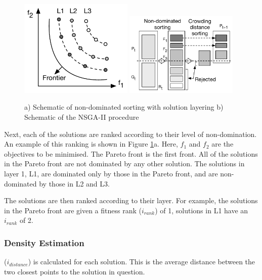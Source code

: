 \begin{figure}[t] 
	\vskip -10pt
	\center
	\includegraphics[width=0.48\textwidth]{Chapter6/figures/carbon_optimiser/paretofrontier/paretofrontier}
	\includegraphics[width=0.480\textwidth]{Chapter6/figures/carbon_optimiser/algsketch/sketch2}
	\vskip -8pt
	\caption{a) Schematic of non-dominated sorting with solution layering b) Schematic of the NSGA-II procedure}
	\label{fig:pareto-layering}
	\vskip -15pt
\end{figure}


Next, each of the solutions are ranked according to their level of non-domination. An example of this ranking is shown in Figure \ref{fig:pareto-layering}a. Here, $f_1$ and $f_2$ are the objectives to be minimised. The Pareto front is the first front. All of the solutions in the Pareto front are not dominated by any other solution. The solutions in layer 1, L1, are dominated only by those in the Pareto front, and are non-dominated by those in L2 and L3.

The solutions are then ranked according to their layer. For example, the solutions in the Pareto front are given a fitness rank ($i_{rank}$) of 1, solutions in L1 have an $i_{rank}$ of 2.

\subsubsection{Density Estimation}
($i_{distance}$) is calculated for each solution. This is the average distance between the two closest points to the solution in question. 


